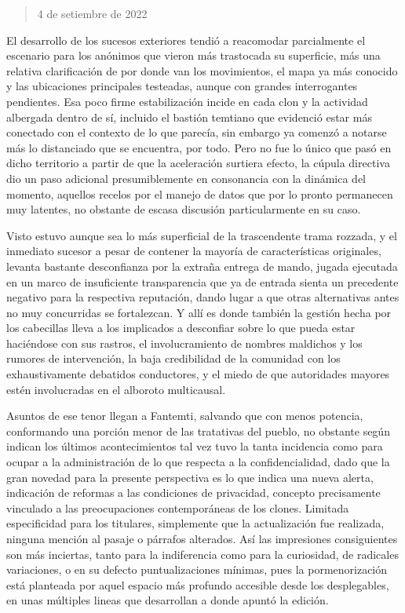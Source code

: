 \documentclass[
]{book}
\begin{document}
\begin{quote}
4 de setiembre de 2022
\end{quote}

El desarrollo de los sucesos exteriores tendió a reacomodar parcialmente el escenario para los anónimos que vieron más trastocada su superficie, más una relativa clarificación de por donde van los movimientos, el mapa ya más conocido y las ubicaciones principales testeadas, aunque con grandes interrogantes pendientes. Esa poco firme estabilización incide en cada clon y la actividad albergada dentro de sí, incluido el bastión temtiano que evidenció estar más conectado con el contexto de lo que parecía, sin embargo ya comenzó a notarse más lo distanciado que se encuentra, por todo. Pero no fue lo único que pasó en dicho territorio a partir de que la aceleración surtiera efecto, la cúpula directiva dio un paso adicional presumiblemente en consonancia con la dinámica del momento, aquellos recelos por el manejo de datos que por lo pronto permanecen muy latentes, no obstante de escasa discusión particularmente en su caso.

Visto estuvo aunque sea lo más superficial de la trascendente trama rozzada, y el inmediato sucesor a pesar de contener la mayoría de características originales, levanta bastante desconfianza por la extraña entrega de mando, jugada ejecutada en un marco de insuficiente transparencia que ya de entrada sienta un precedente negativo para la respectiva reputación, dando lugar a que otras alternativas antes no muy concurridas se fortalezcan. Y allí es donde también la gestión hecha por los cabecillas lleva a los implicados a desconfiar sobre lo que pueda estar haciéndose con sus rastros, el involucramiento de nombres maldichos y los rumores de intervención, la baja credibilidad de la comunidad con los exhaustivamente debatidos conductores, y el miedo de que autoridades mayores estén involucradas en el alboroto multicausal.

Asuntos de ese tenor llegan a Fantemti, salvando que con menos potencia, conformando una porción menor de las tratativas del pueblo, no obstante según indican los últimos acontecimientos tal vez tuvo la tanta incidencia como para ocupar a la administración de lo que respecta a la confidencialidad, dado que la gran novedad para la presente perspectiva es lo que indica una nueva alerta, indicación de reformas a las condiciones de privacidad, concepto precisamente vinculado a las preocupaciones contemporáneas de los clones. Limitada especificidad para los titulares, simplemente que la actualización fue realizada, ninguna mención al pasaje o párrafos alterados. Así las impresiones consiguientes son más inciertas, tanto para la indiferencia como para la curiosidad, de radicales variaciones, o en su defecto puntualizaciones mínimas, pues la pormenorización está planteada por aquel espacio más profundo accesible desde los desplegables, en unas múltiples lineas que desarrollan a donde apuntó la edición.
\end{document}
